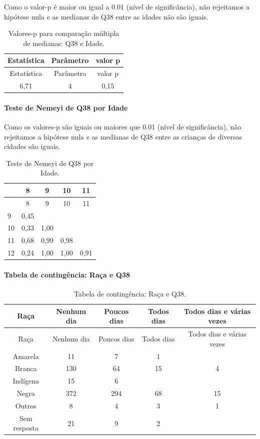 \documentclass[]{article}
\let\oldparagraph\paragraph
\renewcommand{\paragraph}[1]{\oldparagraph{#1}\mbox{}}
\begin{document}
Como o valor-p é maior ou igual a 0.01 (nível de significância), não rejeitamos a hipótese nula e as medianas de Q38 entre as idades não são iguais.

\begin{longtable}[]{@{}ccc@{}}
\caption{\label{tab:unnamed-chunk-1455}Valores-p para comparação múltipla de medianas: Q38 e Idade.}\tabularnewline
\toprule
Estatística & Parâmetro & valor p\tabularnewline
\midrule
\endfirsthead
\toprule
Estatística & Parâmetro & valor p\tabularnewline
\midrule
\endhead
6,71 & 4 & 0,15\tabularnewline
\bottomrule
\end{longtable}

\hypertarget{teste-de-nemeyi-de-q38-por-idade}{%
\paragraph{Teste de Nemeyi de Q38 por Idade}\label{teste-de-nemeyi-de-q38-por-idade}}

Como os valores-p são iguais ou maiores que 0.01 (nível de significância), não rejeitamos a hipótese nula e as medianas de Q38 entre as crianças de diversas cidades são iguais.

\begin{longtable}[]{@{}lcccc@{}}
\caption{\label{tab:unnamed-chunk-1457}Teste de Nemeyi de Q38 por Idade.}\tabularnewline
\toprule
& 8 & 9 & 10 & 11\tabularnewline
\midrule
\endfirsthead
\toprule
& 8 & 9 & 10 & 11\tabularnewline
\midrule
\endhead
9 & 0,45 & & &\tabularnewline
10 & 0,33 & 1,00 & &\tabularnewline
11 & 0,68 & 0,99 & 0,98 &\tabularnewline
12 & 0,24 & 1,00 & 1,00 & 0,91\tabularnewline
\bottomrule
\end{longtable}

\cleardoublepage

\hypertarget{tabela-de-continguxeancia-rauxe7a-e-q38}{%
\paragraph{Tabela de contingência: Raça e Q38}\label{tabela-de-continguxeancia-rauxe7a-e-q38}}

\begin{longtable}[]{@{}ccccc@{}}
\caption{\label{tab:unnamed-chunk-1458}Tabela de contingência: Raça e Q38.}\tabularnewline
\toprule
Raça & Nenhum dia & Poucos dias & Todos dias & Todos dias e várias vezes\tabularnewline
\midrule
\endfirsthead
\toprule
Raça & Nenhum dia & Poucos dias & Todos dias & Todos dias e várias vezes\tabularnewline
\midrule
\endhead
Amarela & 11 & 7 & 1 &\tabularnewline
Branca & 130 & 64 & 15 & 4\tabularnewline
Indígena & 15 & 6 & &\tabularnewline
Negra & 372 & 294 & 68 & 15\tabularnewline
Outros & 8 & 4 & 3 & 1\tabularnewline
Sem resposta & 21 & 9 & 2 &\tabularnewline
\bottomrule
\end{longtable}
\end{document}
